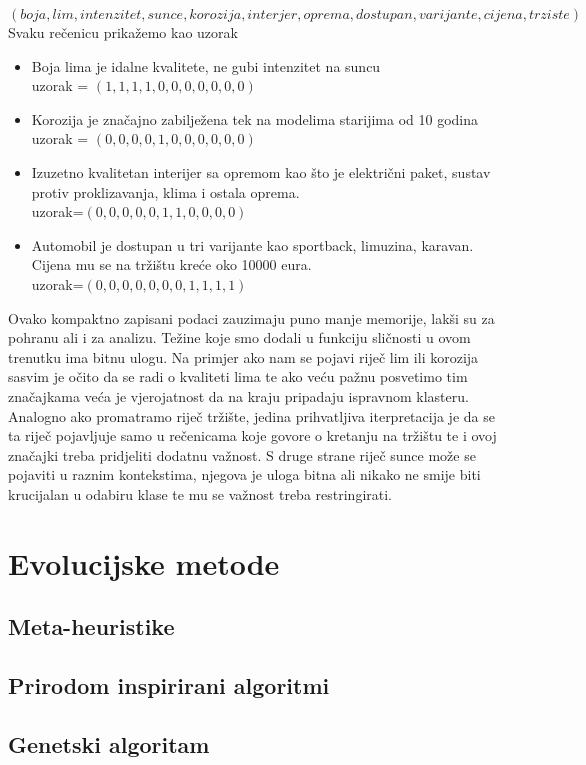\documentclass[a4paper,twoside,12pt]{memoir} %
\begin{document}
\[ (boja, lim, intenzitet, sunce, korozija, interjer, oprema, dostupan, varijante, cijena, trziste) \]
Svaku rečenicu prikažemo kao uzorak
\begin{itemize}
\item Boja lima je idalne kvalitete, ne gubi intenzitet na suncu\\uzorak = $(1,1,1,1,0,0,0,0,0,0,0)$
\item Korozija je značajno zabilježena tek na modelima starijima od 10 godina\\
uzorak = $(0,0,0,0,1,0,0,0,0,0,0)$
\item Izuzetno kvalitetan interijer sa opremom kao što je električni paket, sustav protiv proklizavanja, klima i ostala oprema.\\
uzorak=$(0,0,0,0,0,1,1,0,0,0,0)$
\item  Automobil je dostupan u tri varijante kao sportback, limuzina, karavan. Cijena mu se na tržištu kreće oko 10000 eura.\\
uzorak=$(0,0,0,0,0,0,0,1,1,1,1)$
\end{itemize}
Ovako kompaktno zapisani podaci zauzimaju puno manje memorije, lakši su za pohranu ali i za analizu. Težine koje smo dodali u funkciju sličnosti u ovom trenutku ima bitnu ulogu. Na primjer ako nam se pojavi riječ lim ili korozija sasvim je očito da se radi o kvaliteti lima te ako veću pažnu posvetimo tim značajkama veća je vjerojatnost da na kraju pripadaju ispravnom klasteru. Analogno ako promatramo riječ tržište, jedina prihvatljiva iterpretacija je da se ta riječ pojavljuje samo u rečenicama koje govore o kretanju na tržištu te i ovoj značajki treba pridjeliti dodatnu važnost. S druge strane riječ sunce može se pojaviti u raznim kontekstima, njegova je uloga bitna ali nikako ne smije biti krucijalan u odabiru klase te mu se važnost treba restringirati.
\chapter[Evolucijske metode]{Evolucijske metode}
\label{chp:heuristike}
\section[Meta-heuristike][Meta-heuristike]{Meta-heuristike}
\section{Prirodom inspirirani algoritmi}
\section{Genetski algoritam}
\end{document}
